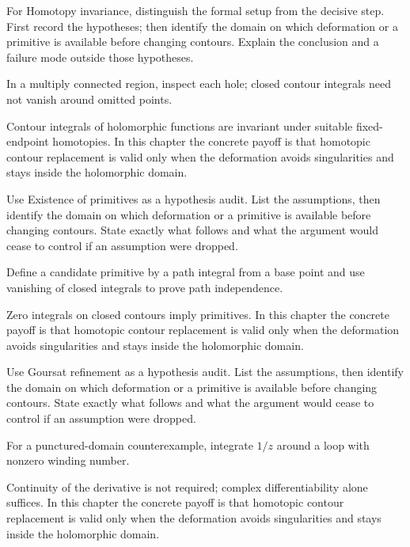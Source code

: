 \begin{exercise}\label{exr:iv05-04}
For Homotopy invariance, distinguish the formal setup from the decisive step. First record the hypotheses; then identify the domain on which deformation or a primitive is available before changing contours. Explain the conclusion and a failure mode outside those hypotheses.
\end{exercise}
\begin{hint}
In a multiply connected region, inspect each hole; closed contour integrals need not vanish around omitted points.
\end{hint}
\begin{solution}
Contour integrals of holomorphic functions are invariant under suitable fixed-endpoint homotopies. In this chapter the concrete payoff is that homotopic contour replacement is valid only when the deformation avoids singularities and stays inside the holomorphic domain.
\end{solution}

\begin{exercise}\label{exr:iv05-05}
Use Existence of primitives as a hypothesis audit. List the assumptions, then identify the domain on which deformation or a primitive is available before changing contours. State exactly what follows and what the argument would cease to control if an assumption were dropped.
\end{exercise}
\begin{hint}
Define a candidate primitive by a path integral from a base point and use vanishing of closed integrals to prove path independence.
\end{hint}
\begin{solution}
Zero integrals on closed contours imply primitives. In this chapter the concrete payoff is that homotopic contour replacement is valid only when the deformation avoids singularities and stays inside the holomorphic domain.
\end{solution}

\begin{exercise}\label{exr:iv05-06}
Use Goursat refinement as a hypothesis audit. List the assumptions, then identify the domain on which deformation or a primitive is available before changing contours. State exactly what follows and what the argument would cease to control if an assumption were dropped.
\end{exercise}
\begin{hint}
For a punctured-domain counterexample, integrate \(1/z\) around a loop with nonzero winding number.
\end{hint}
\begin{solution}
Continuity of the derivative is not required; complex differentiability alone suffices. In this chapter the concrete payoff is that homotopic contour replacement is valid only when the deformation avoids singularities and stays inside the holomorphic domain.
\end{solution}


